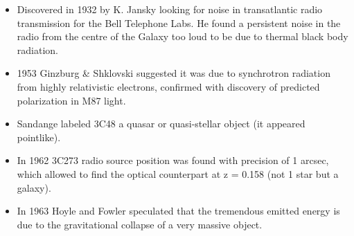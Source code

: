 \documentclass[
  letterpaper,
  DIV=11,
  numbers=noendperiod]{scrreprt}
\begin{document}
\begin{itemize}
\item
  Discovered in 1932 by K. Jansky looking for noise in transatlantic
  radio transmission for the Bell Telephone Labs. He found a persistent
  noise in the radio from the centre of the Galaxy too loud to be due to
  thermal black body radiation.
\item
  1953 Ginzburg \& Shklovski suggested it was due to synchrotron
  radiation from highly relativistic electrons, confirmed with discovery
  of predicted polarization in M87 light.
\item
  Sandange labeled 3C48 a quasar or quasi-stellar object (it appeared
  pointlike).
\item
  In 1962 3C273 radio source position was found with precision of 1
  arcsec, which allowed to find the optical counterpart at z = 0.158
  (not 1 star but a galaxy).
\item
  In 1963 Hoyle and Fowler speculated that the tremendous emitted energy
  is due to the gravitational collapse of a very massive object.
\end{itemize}
\end{document}
